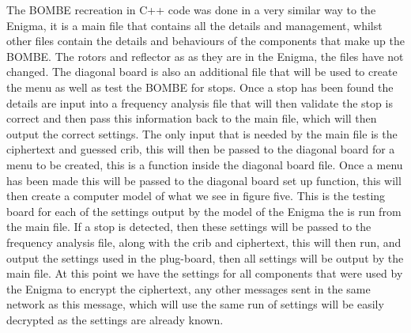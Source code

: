 \documentclass[12pt,a4paper]{article}
\begin{document}
The BOMBE recreation in C++ code was done in a very similar way to the Enigma, it is a main file that contains all the details and management, whilst other files contain the details and behaviours of the components that make up the BOMBE. The rotors and reflector as as they are in the Enigma, the files have not changed. The diagonal board is also an additional file that will be used to create the menu as well as test the BOMBE for stops. Once a stop has been found the details are input into a frequency analysis file that will then validate the stop is correct and then pass this information back to the main file, which will then output the correct settings. The only input that is needed by the main file is the ciphertext and guessed crib, this will then be passed to the diagonal board for a menu to be created, this is a function inside the diagonal board file. Once a menu has been made this will be passed to the diagonal board set up function, this will then create a computer model of what we see in figure five. This is the testing board for each of the settings output by the model of the Enigma the is run from the main file. If a stop is detected, then these settings will be passed to the frequency analysis file, along with the crib and ciphertext, this will then run, and output the settings used in the plug-board, then all settings will be output by the main file. At this point we have the settings for all components that were used by the Enigma to encrypt the ciphertext, any other messages sent in the same network as this message, which will use the same run of settings will be easily decrypted as the settings are already known.\\
\end{document}
